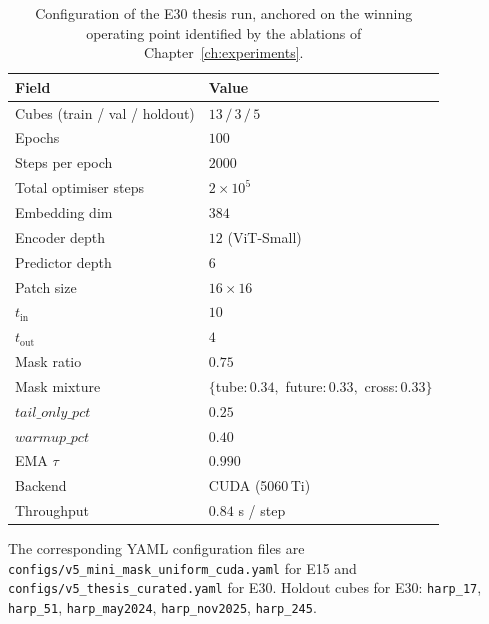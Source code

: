 \begin{table}[htbp]
\centering
\begin{tabular}{ll}
\toprule
Field & Value \\
\midrule
Cubes (train / val / holdout) & $13 \,/\, 3 \,/\, 5$ \\
Epochs                        & $100$ \\
Steps per epoch               & $2000$ \\
Total optimiser steps         & $2 \times 10^{5}$ \\
Embedding dim                 & $384$ \\
Encoder depth                 & $12$ (ViT-Small) \\
Predictor depth               & $6$ \\
Patch size                    & $16 \times 16$ \\
$t_{\text{in}}$               & $10$ \\
$t_{\text{out}}$              & $4$ \\
Mask ratio                    & $0.75$ \\
Mask mixture                  & $\{$tube$:0.34,$ future$:0.33,$ cross$:0.33\}$ \\
$\mathit{tail\_only\_pct}$    & $0.25$ \\
$\mathit{warmup\_pct}$        & $0.40$ \\
EMA $\tau$                    & $0.990$ \\
Backend                       & CUDA (5060\,Ti) \\
Throughput                    & $0.84$ s / step \\
\bottomrule
\end{tabular}
\caption{Configuration of the E30 thesis run, anchored on the
winning operating point identified by the ablations of
Chapter~\ref{ch:experiments}.}
\label{tab:cfg-e30}
\end{table}

The corresponding YAML configuration files are
\texttt{configs/v5\_mini\_mask\_uniform\_cuda.yaml} for E15 and
\texttt{configs/v5\_thesis\_curated.yaml} for E30. Holdout cubes
for E30: \texttt{harp\_17}, \texttt{harp\_51},
\texttt{harp\_may2024}, \texttt{harp\_nov2025},
\texttt{harp\_245}.
